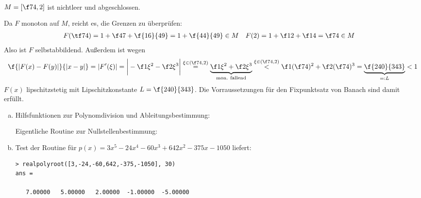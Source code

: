 \documentclass{mywork}
\begin{document}
\begin{aufgabe}~

	$M = [\f 74, 2]$ ist nichtleer und abgeschlossen.

	Da $F$ monoton auf $M$, reicht es, die Grenzen zu überprüfen:
	\begin{align*}
		F(\tf 74) &= 1 + \f 47 + \f {16}{49} = 1 + \f {44}{49} \in M &
		F(2) &= 1 + \f 12 + \f 14 = \f 74 \in M
	\end{align*}
	Also ist $F$ selbstabbildend.
	Außerdem ist wegen
	\[
		\f {|F(x) - F(y)|}{|x-y|} 
		= |F'(\xi)| 
		= \bigg| - \f 1{\xi^2} - \f 2{\xi^3} \bigg| \stackrel{\xi \in (\f 74, 2)}
		= \underbrace{\f 1{\xi^2} + \f 2{\xi^3} }_{\text{mon. fallend}} 
		\stackrel{\xi \in (\f 74, 2)}< \f 1{(\f 74)^2} + \f 2{(\f 74)^3} 
		= \underbrace{\f {240}{343}}_{=:L} < 1
	\]
	$F(x)$ lipschitzstetig mit Lipschitzkonstante $L = \f {240}{343}$.
	Die Vorraussetzungen für den Fixpunktsatz von Banach sind damit erfüllt.
\end{aufgabe}

\newpage 

\begin{aufgabe}
	
	\begin{enumerate}[a)]
		\item
			Hilfsfunktionen zur Polynomdivision und Ableitungsbestimmung:
			
			
			Eigentliche Routine zur Nullstellenbestimmung:
			
		\item
			Test der Routine für $p(x) = 3x^5 - 24x^4 - 60x^3 + 642x^2 - 375x - 1050$ liefert:
			\begin{verbatim}
> realpolyroot([3,-24,-60,642,-375,-1050], 30)
ans =

   7.00000   5.00000   2.00000  -1.00000  -5.00000
			\end{verbatim}
	\end{enumerate}
\end{aufgabe}
\end{document}
